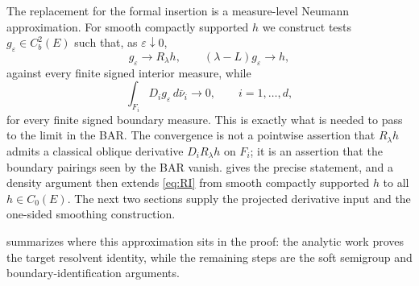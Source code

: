 \documentclass[aihp]{imsart}
\numberwithin{equation}{section}
\theoremstyle{plain}
\theoremstyle{definition}
\newcommand{\1}{\mathbf 1}
\begin{document}
The replacement for the formal insertion is a measure-level Neumann approximation.  For smooth compactly supported $h$ we construct tests $g_\varepsilon\in C_b^2(E)$ such that, as $\varepsilon\downarrow0$,
\[
 g_\varepsilon\to R_\lambda h,
 \qquad
 (\lambda-L)g_\varepsilon\to h,
\]
against every finite signed interior measure, while
\[
 \int_{F_i}D_i g_\varepsilon\,d\bar\nu_i\to0,
 \qquad i=1,\ldots,d,
\]
for every finite signed boundary measure.  This is exactly what is needed to pass to the limit in the BAR.  The convergence is not a pointwise assertion that $R_\lambda h$ admits a classical oblique derivative $D_iR_\lambda h$ on $F_i$; it is an assertion that the boundary pairings seen by the BAR vanish.   gives the precise statement, and a density argument then extends \eqref{eq:RI} from smooth compactly supported $h$ to all $h\in C_0(E)$.  The next two sections supply the projected derivative input and the one-sided smoothing construction.

 summarizes where this approximation sits in the proof: the analytic work proves the target resolvent identity, while the remaining steps are the soft semigroup and boundary-identification arguments.
\end{document}
